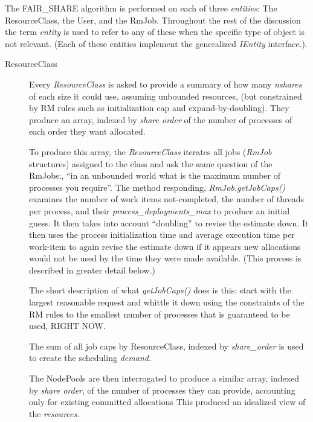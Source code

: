     The FAIR\_SHARE algorithm is performed on each of three {\em entities}: The ResourceClass, the User, and
    the RmJob.  Throughout the rest of the discussion the term {\em entity} is used to refer to any
    of these when the specific type of object is not relevant.  (Each of these entities implement the
    generalized {\em IEntity} interface.).

    \begin{description}
      \item[ResourceClass] Every {\em ResourceClass} is asked to provide a summary of how many {\em nshares}
        of each size it could use, assuming unbounded resources, (but constrained by RM rules such
        as initialization cap and expand-by-doubling).  They produce an
        array, indexed by {\em share order} of the number of processes of each order they want allocated.

        To produce this array, the {\em ResourceClass} iterates all jobs ({\em RmJob} structures) assigned to the class and ask 
        the same question of the RmJobs:, ``in an unbounded world what is the maximum number of processes you require''.  The
        method responding, {\em RmJob.getJobCaps()} examines the number of work items not-completed, the number
        of threads per process, and their {\em process\_deployments\_max} to produce an initial guess.  It then
        takes into account ``doubling'' to revise the estimate down.  It then uses the process initialization
        time and average execution time per work-item to again revise the estimate down if it appears
        new allocations would not be used by the time they were made available. (This process is described in greater
        detail below.)

        The short description of what {\em getJobCaps()} does is this: start with the largest reasonable request
        and whittle it down using the constraints of the RM rules to the smallest number of processes that
        is guaranteed to be used, RIGHT NOW.

        The sum of all job caps by ResourceClass, indexed by {\em share\_order} is used to create
        the scheduling {\em demand.}
        
        The NodePools are then interrogated to produce a similar array, indexed by {\em share
          order}, of the number of processes they can provide, accounting only for existing
        committed allocations This produced an idealized view of the {\em resources}.


\end{description}
